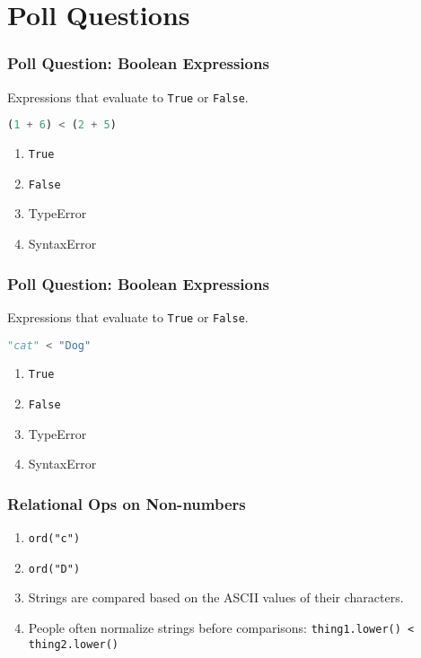 \documentclass{beamer}
\begin{document}
\section{Poll Questions}

%
%
\begin{frame}[fragile]
	\frametitle{Poll Question: Boolean Expressions}
	Expressions that evaluate to \lstinline|True| or \lstinline|False|. 
	\begin{lstlisting}[language=Python, autogobble]
	(1 + 6) < (2 + 5)
	\end{lstlisting}
	\vfill
	\begin{enumerate}[A]
		\item \lstinline|True|
		\item \lstinline|False|
		\item TypeError
		\item SyntaxError
	\end{enumerate}
\end{frame}

%
%
\begin{frame}[fragile]
	\frametitle{Poll Question: Boolean Expressions}
	Expressions that evaluate to \lstinline|True| or \lstinline|False|. 
	\begin{lstlisting}[language=Python, autogobble]
	"cat" < "Dog"
	\end{lstlisting}
	\vfill
	\begin{enumerate}[A]
		\item \lstinline|True|
		\item \lstinline|False|
		\item TypeError
		\item SyntaxError
	\end{enumerate}
\end{frame}

%
%
\begin{frame}[fragile]
	\frametitle{Relational Ops on Non-numbers}
	\begin{enumerate}[A]
		\item \lstinline|ord("c")| 
			\pause
		\item \lstinline|ord("D")| 
			\pause
		\item Strings are compared based on the ASCII values of their characters.
			\pause
		\item People often normalize strings before comparisons: \lstinline|thing1.lower() < thing2.lower()|
	\end{enumerate}
\end{frame}
\end{document}
